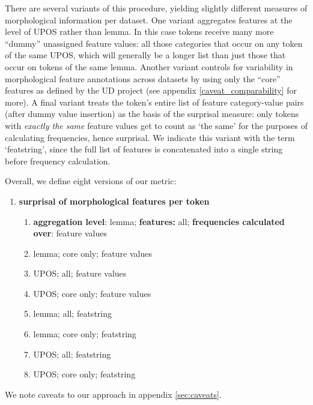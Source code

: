 \documentclass[USenglish]{article}
\begin{document}
There are several variants of this procedure, yielding slightly different measures of morphological information per dataset.
One variant aggregates features at the level of UPOS rather than lemma.
In this case tokens receive many more ``dummy'' unassigned feature values: all those categories that occur on any token of the same UPOS, which will generally be a longer list than just those that occur on tokens of the same lemma.
Another variant controls for variability in morphological feature annotations across datasets by using only the ``core'' features as defined by the UD project (see appendix \ref{caveat_comparability} for more).
A final variant treats the token's entire list of feature category-value pairs (after dummy value insertion) as the basis of the surprisal measure: only tokens with \textit{exactly the same} feature values get to count as `the same' for the purposes of calculating frequencies, hence surprisal.
We indicate this variant with the term `featstring', since the full list of features is concatenated into a single string before frequency calculation.

Overall, we define eight versions of our metric:

\begin{enumerate}
    \item \textbf{surprisal of morphological features per token}
    \begin{enumerate}
  \renewcommand{\labelenumi}{\alph{enumi})}
  \item \textbf{aggregation level}: lemma; \textbf{features:} all; \textbf{frequencies calculated over}: feature values
  \item lemma; core only; feature values
  \item UPOS; all; feature values
  \item UPOS; core only; feature values
  \item lemma; all; featstring
  \item lemma; core only; featstring
  \item UPOS; all; featstring
  \item UPOS; core only; featstring
\end{enumerate}
\end{enumerate}

We note caveats to our approach in appendix \ref{sec:caveats}. 
\end{document}
